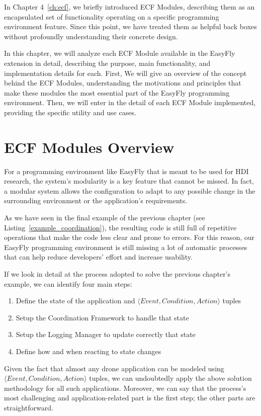 In Chapter 4~\ref{ch:ecf}, we briefly introduced ECF Modules, describing them as an encapsulated set of functionality operating on a specific programming environment feature.
Since this point, we have treated them as helpful back boxes without profoundly understanding their concrete design.

In this chapter, we will analyze each ECF Module available in the EasyFly extension in detail, describing the purpose, main functionality, and implementation details for each. 
First, We will give an overview of the concept behind the ECF Modules, understanding the motivations and principles that make these modules the most essential part of the EasyFly programming environment.
Then, we will enter in the detail of each ECF Module implemented, providing the specific utility and use cases.

\section{ECF Modules Overview}\label{sec:modules_overview}
For a programming environment like EasyFly that is meant to be used for HDI research, the system's modularity is a key feature that cannot be missed.
In fact, a modular system allows the configuration to adapt to any possible change in the surrounding environment or the application's requirements.

As we have seen in the final example of the previous chapter (see Listing~\ref{example_coordination}), the resulting code is still full of repetitive operations that make the code less clear and prone to errors.
For this reason, our EasyFly programming environment is still missing a lot of automatic processes that can help reduce developers' effort and increase usability. 

If we look in detail at the process adopted to solve the previous chapter's example, we can identify four main steps:
\begin{enumerate}
    \item Define the state of the application and \( \langle Event, Condition, Action \rangle \) tuples
    \item Setup the Coordination Framework to handle that state
    \item Setup the Logging Manager to update correctly that state
    \item Define how and when reacting to state changes
\end{enumerate}

Given the fact that almost any drone application can be modeled using\\
\( \langle Event, Condition, Action \rangle \) tuples, we can undoubtedly apply the above solution methodology for all such applications.
Moreover, we can say that the process's most challenging and application-related part is the first step; the other parts are straightforward.

